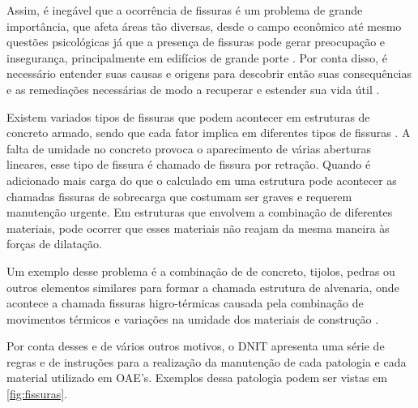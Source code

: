 Assim, é inegável que a ocorrência de fissuras é um problema de grande importância, que afeta áreas tão diversas, desde o campo econômico até mesmo questões psicológicas já que a presença de fissuras pode gerar preocupação e insegurança, principalmente em edifícios de grande porte \cite{andrade1998durabilidade}.
Por conta disso, é necessário entender suas causas e origens para descobrir então suas consequências e as remediações necessárias de modo a recuperar e estender sua vida útil \cite{de1998patologia}.

Existem variados tipos de fissuras que podem acontecer em estruturas de concreto armado, sendo que cada fator implica em diferentes tipos de fissuras \cite{nakamura2007}. 
A falta de umidade no concreto provoca o aparecimento de várias aberturas lineares, esse tipo de fissura é chamado de fissura por retração. 
Quando é adicionado mais carga do que o calculado em uma estrutura pode acontecer as chamadas fissuras de sobrecarga que costumam ser graves e requerem manutenção urgente. 
Em estruturas que envolvem a combinação de diferentes materiais, pode ocorrer que esses materiais não reajam da mesma maneira às forças de dilatação.

Um exemplo desse problema é a combinação de de concreto, tijolos, pedras ou outros elementos similares para formar a chamada estrutura de alvenaria, onde acontece a chamada fissuras higro-térmicas causada pela combinação de movimentos térmicos e variações na umidade dos materiais de construção \cite{nakamura2007}.

Por conta desses e de vários outros motivos, o DNIT apresenta uma série de regras e de instruções para a realização da manutenção de cada patologia e cada material utilizado em OAE's. Exemplos dessa patologia podem ser vistas em \autoref{fig:fissuras}.

